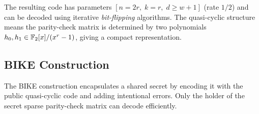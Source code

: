 The resulting code has parameters $[n = 2r,\; k = r,\; d \geq w + 1]$ (rate $1/2$) and can be decoded using iterative \emph{bit-flipping} algorithms.  The quasi-cyclic structure means the parity-check matrix is determined by two polynomials $h_0, h_1 \in \mathbb{F}_2[x]/(x^r - 1)$, giving a compact representation.


\subsection{BIKE Construction}
\label{subsec:bike-construction}

The BIKE construction encapsulates a shared secret by encoding it with the public quasi-cyclic code and adding intentional errors.  Only the holder of the secret sparse parity-check matrix can decode efficiently.

